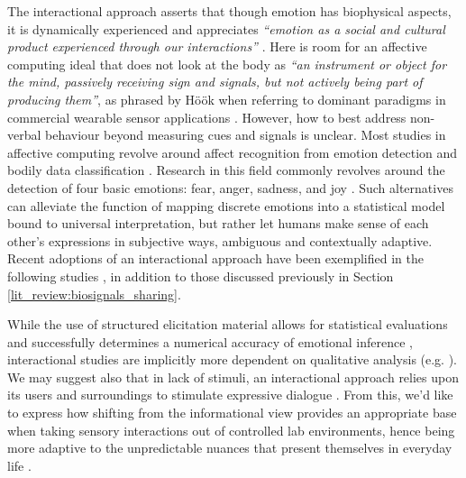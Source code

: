 The interactional approach asserts that though emotion has biophysical aspects, it is dynamically experienced and appreciates \textit{``emotion as a social and cultural product experienced through our interactions''} \cite{boehner_how_2007}. Here is room for an affective computing ideal that does not look at the body as \textit{“an instrument or object for the mind, passively receiving sign and signals, but not actively being part of producing them”}, as phrased by Höök when referring to dominant paradigms in commercial wearable sensor applications \cite{hook_kristina_affective_2012}. However, how to best address non-verbal behaviour beyond measuring cues and signals is unclear. Most studies in affective computing revolve around affect recognition from emotion detection and bodily data classification \cite{bota_review_2019}. Research in this field commonly revolves around the detection of four basic emotions: fear, anger, sadness, and joy \cite{picard_mit_nodate}. Such alternatives can alleviate the function of mapping discrete emotions into a statistical model bound to universal interpretation, but rather let humans make sense of each other's expressions in subjective ways, ambiguous and contextually adaptive. Recent adoptions of an interactional approach have been exemplified in the following studies \cite{sanches_ambiguity_2019,umair_thermopixels_2020,fosh_see_2013}, in addition to those discussed previously in Section \ref{lit_review:biosignals_sharing}.

While the use of structured elicitation material allows for statistical evaluations and successfully determines a numerical accuracy of emotional inference \cite{bota_review_2019}, interactional studies are implicitly more dependent on qualitative analysis (e.g. \cite{hook_embracing_2018,howell_life-affirming_2019}). We may suggest also that in lack of stimuli, an interactional approach relies upon its users and surroundings to stimulate expressive dialogue \cite{gonzalez_dance-inspired_2012}. From this, we'd like to express how shifting from the informational view provides an appropriate base when taking sensory interactions out of controlled lab environments, hence being more adaptive to the unpredictable nuances that present themselves in everyday life \cite{brown_into_2011,stjerna_aspects_2013,maki-petaja_aesthetic_2014}.

